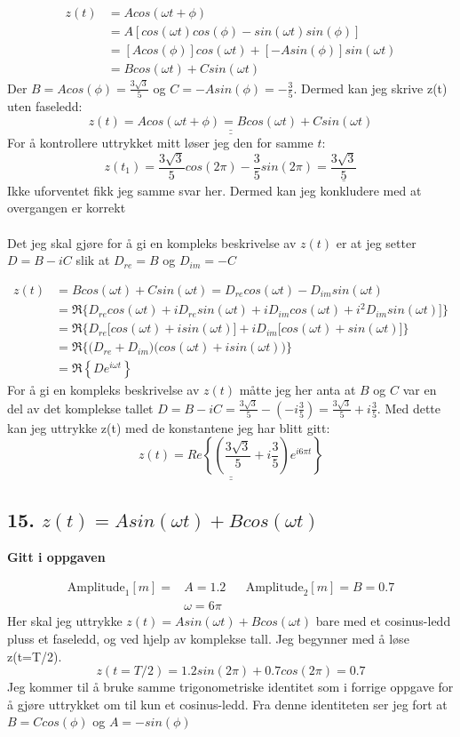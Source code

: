 \documentclass[a4paper,12pt,norsk]{article}
\newcommand{\uu}{\underline}
\begin{document}
\begin{align*}
z(t) &= Acos(\omega t + \phi) \\
&= A[cos(\omega t)cos(\phi) - sin(\omega t)sin(\phi)]\\
&= [Acos(\phi)] cos(\omega t) + [-Asin(\phi)] sin(\omega t)\\ 
&= Bcos(\omega t) + Csin(\omega t)
\end{align*}
Der $B = Acos(\phi) = \frac{3\sqrt{3}}{5}$ og $C = -Asin(\phi) = - \frac{3}{5}$. Dermed kan jeg skrive z(t) uten faseledd:
$$
\uu{\uu{z(t) = Acos(\omega t + \phi) = Bcos(\omega t) + Csin(\omega t)}}
$$
For å kontrollere uttrykket mitt løser jeg den for samme $t$:
$$
z(t_1) = \frac{3\sqrt{3}}{5}cos(2\pi) -\frac{3}{5}sin(2\pi) = \uu{\frac{3\sqrt{3}}{5}}
$$
Ikke uforventet fikk jeg samme svar her. Dermed kan jeg konkludere med at overgangen er korrekt\\ 
\\
Det jeg skal gjøre for å gi en kompleks beskrivelse av $z(t)$ er at jeg setter $D = B -iC$ slik at $D_{re} = B$ og $D_{im} = - C$

\begin{align*}
z(t) &= Bcos(\omega t) + Csin(\omega t) = D_{re}cos(\omega t) - D_{im}sin(\omega t) \\
&= \Re \Big\{D_{re}cos(\omega t) + iD_{re}sin(\omega t) + iD_{im}cos(\omega t) + i^2D_{im}sin(\omega t)\big]\Big\} \\
&= \Re \Big\{D_{re}\big[cos(\omega t) + isin(\omega t)\big] + iD_{im}\big[cos(\omega t) + sin(\omega t)\big]\Big\} \\
&= \Re \Big\{ \big( D_{re}+D_{im}\big) \big(cos(\omega t) + isin(\omega t) \big) \Big\} \\
&= \Re \left\{De^{i\omega t} \right\} 
\end{align*}
For å gi en kompleks beskrivelse av $z(t)$ måtte jeg her anta at $B$ og $C$ var en del av det komplekse tallet $D = B -iC = \frac{3\sqrt{3}}{5} -\left(-i\frac{3}{5}\right) = \frac{3\sqrt{3}}{5} +i\frac{3}{5}$. Med dette kan jeg uttrykke z(t) med de konstantene jeg har blitt gitt:
$$
\uu{\uu{z(t) = Re\left\{ \left(\frac{3\sqrt{3}}{5} +i\frac{3}{5}\right)e^{i6\pi t} \right\}}}
$$

\subsection{15. $z(t) = Asin(\omega t) + Bcos(\omega t)$}

\begin{center}
\textbf{Gitt i oppgaven}
\end{center}
\begin{align*}
\text{Amplitude}_1[m]= &A = 1.2 &&  \text{Amplitude}_2[m]= B = 0.7\\
&\omega =  6\pi && 
\end{align*}
Her skal jeg uttrykke $z(t) = Asin(\omega t) + Bcos(\omega t)$ bare med et cosinus-ledd pluss et faseledd, og ved hjelp av komplekse tall. Jeg begynner med å løse z(t=T/2).
$$
z(t=T/2) = 1.2sin(2\pi) + 0.7cos(2\pi) = 0.7
$$
Jeg kommer til å bruke samme trigonometriske identitet som i forrige oppgave for å gjøre uttrykket om til kun et cosinus-ledd. Fra denne identiteten ser jeg fort at $B = Ccos(\phi)$ og $A = -sin(\phi)$
\end{document}
